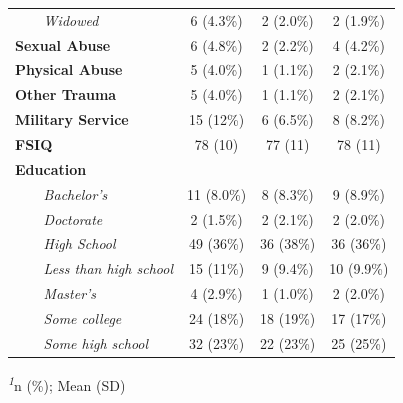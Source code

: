 \begin{table}[t]
\begin{tabular*}{\linewidth}{@{\extracolsep{\fill}}lccc}
{\itshape     Widowed} & 6 (4.3\%) & 2 (2.0\%) & 2 (1.9\%) \\ 
{\bfseries Sexual Abuse} & 6 (4.8\%) & 2 (2.2\%) & 4 (4.2\%) \\ 
{\bfseries Physical Abuse} & 5 (4.0\%) & 1 (1.1\%) & 2 (2.1\%) \\ 
{\bfseries Other Trauma} & 5 (4.0\%) & 1 (1.1\%) & 2 (2.1\%) \\ 
{\bfseries Military Service} & 15 (12\%) & 6 (6.5\%) & 8 (8.2\%) \\ 
{\bfseries FSIQ} & 78 (10) & 77 (11) & 78 (11) \\ 
{\bfseries Education} &  &  &  \\ 
{\itshape     Bachelor's} & 11 (8.0\%) & 8 (8.3\%) & 9 (8.9\%) \\ 
{\itshape     Doctorate} & 2 (1.5\%) & 2 (2.1\%) & 2 (2.0\%) \\ 
{\itshape     High School} & 49 (36\%) & 36 (38\%) & 36 (36\%) \\ 
{\itshape     Less than high school} & 15 (11\%) & 9 (9.4\%) & 10 (9.9\%) \\ 
{\itshape     Master's} & 4 (2.9\%) & 1 (1.0\%) & 2 (2.0\%) \\ 
{\itshape     Some college} & 24 (18\%) & 18 (19\%) & 17 (17\%) \\ 
{\itshape     Some high school} & 32 (23\%) & 22 (23\%) & 25 (25\%) \\ 
\bottomrule
\end{tabular*}
\begin{minipage}{\linewidth}
\textsuperscript{\textit{1}}n (\%); Mean (SD)\\
\end{minipage}
\end{table}

